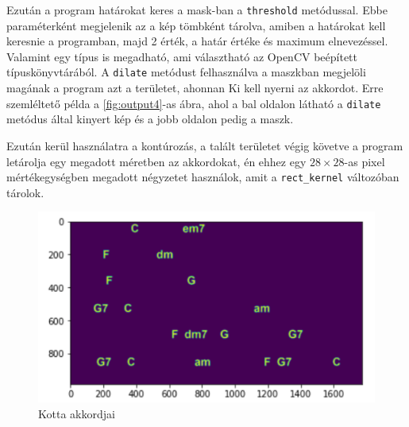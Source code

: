Ezután a program határokat keres a mask-ban a \texttt{threshold} metódussal. Ebbe paraméterként megjelenik az a kép tömbként tárolva, amiben a határokat kell keresnie a programban, majd 2 érték, a határ értéke és maximum elnevezéssel. Valamint egy típus is megadható, ami választható az OpenCV beépített típuskönyvtárából. A \texttt{dilate} metódust felhasználva a maszkban megjelöli magának a program azt a területet, ahonnan Ki kell nyerni az akkordot. Erre szemléltető példa a \ref{fig:output4}-as ábra, ahol a bal oldalon látható a \texttt{dilate} metódus által kinyert kép és a jobb oldalon pedig a maszk.

Ezután kerül használatra a kontúrozás, a talált területet végig követve a program letárolja egy megadott méretben az akkordokat, én ehhez egy $28 \times 28$-as pixel mértékegységben megadott négyzetet használok, amit a \texttt{rect\_kernel} változóban tárolok.

\begin{figure}[h]
	\centering
	\includegraphics[width=\textwidth]{images/output_justchords.png}
	\caption{Kotta akkordjai}
	\label{fig:output2}
\end{figure}

